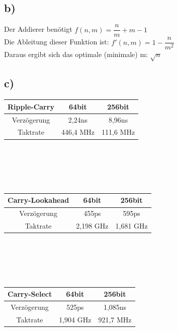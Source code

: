 \documentclass[a4paper]{scrartcl}
\begin{document}
	\subsection{b)}
	
	Der Addierer benötigt $ f(n,m)= \dfrac{n}{m} + m - 1$\\
	Die Ableitung dieser Funktion ist: $ f'(n,m)=1-\dfrac{n}{m^2} $\\
	Daraus ergibt sich das optimale (minimale) m: $ \sqrt{n} $
	
	\subsection{c)}
	\begin{tabular}{|c|c|c|} \hline
	 \textbf{Ripple-Carry}&64bit&256bit \\ \hline
	 Verzögerung & 2,24ns  & 8,96ns \\ \hline
	 Taktrate & 446,4 MHz & 111,6 MHz \\ \hline
	\end{tabular}\\
	\\
	\\
	\\
	\begin{tabular}{|c|c|c|} \hline
	\textbf{Carry-Lookahead}&64bit&256bit \\ \hline
	Verzögerung & 455ps  & 595ps \\ \hline
	Taktrate & 2,198 GHz & 1,681 GHz \\ \hline
	\end{tabular}\\
	\\
	\\
	\\
	\begin{tabular}{|c|c|c|} \hline
	\textbf{Carry-Select}&64bit&256bit \\ \hline
	Verzögerung & 525ps  & 1,085ns \\ \hline
	Taktrate & 1,904 GHz & 921,7 MHz \\ \hline
	\end{tabular}\\
	
\end{document}
